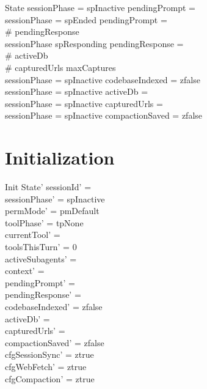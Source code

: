 \documentclass[a4paper,10pt,fleqn]{article}
\begin{document}
\begin{schema}{State}
  sessionPhase = spInactive \implies pendingPrompt = \emptyset \\
  sessionPhase = spEnded \implies pendingPrompt = \emptyset \\
  \# pendingResponse  \\
  sessionPhase \neq spResponding \implies pendingResponse = \emptyset \\
  \# activeDb  \\
  \# capturedUrls \leq maxCaptures \\
  sessionPhase = spInactive \implies codebaseIndexed = zfalse \\
  sessionPhase = spInactive \implies activeDb = \emptyset \\
  sessionPhase = spInactive \implies capturedUrls = \emptyset \\
  sessionPhase = spInactive \implies compactionSaved = zfalse
\end{schema}

\section{Initialization}

\begin{schema}{Init}
  State'
  \where
  sessionId' = \emptyset \\
  sessionPhase' = spInactive \\
  permMode' = pmDefault \\
  toolPhase' = tpNone \\
  currentTool' = \emptyset \\
  toolsThisTurn' = 0 \\
  activeSubagents' = \emptyset \\
  context' = \langle \rangle \\
  pendingPrompt' = \emptyset \\
  pendingResponse' = \emptyset \\
  codebaseIndexed' = zfalse \\
  activeDb' = \emptyset \\
  capturedUrls' = \emptyset \\
  compactionSaved' = zfalse \\
  cfgSessionSync' = ztrue \\
  cfgWebFetch' = ztrue \\
  cfgCompaction' = ztrue
\end{schema}
\end{document}
